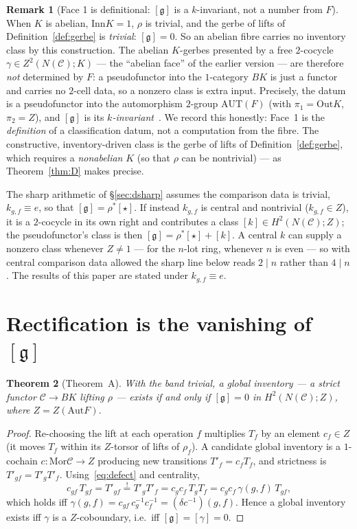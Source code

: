 \documentclass[11pt]{article}
\newtheorem{theorem}{Theorem}
\theoremstyle{definition}
\newtheorem{remark}[theorem]{Remark}
\newcommand{\C}{\mathcal{C}}
\newcommand{\Mor}{\mathrm{Mor}}
\newcommand{\Aut}{\mathrm{Aut}}
\newcommand{\Inn}{\mathrm{Inn}}
\newcommand{\Out}{\mathrm{Out}}
\newcommand{\Zc}{Z}
\newcommand{\gerbe}{\mathfrak{g}}
\begin{document}
\begin{remark}[{Face 1 is definitional: $[\gerbe]$ is a $k$-invariant, not a number from $F$}]%
\label{rem:kinvariant}
When $K$ is abelian, $\Inn K=1$, $\rho$ is trivial, and the gerbe of lifts of
Definition~\ref{def:gerbe} is \emph{trivial}: $[\gerbe]=0$. So an abelian fibre carries no
inventory class by this construction. The abelian $K$-gerbes presented by a free $2$-cocycle
$\gamma\in Z^2(N(\C);K)$ --- the ``abelian face'' of the earlier version --- are therefore
\emph{not} determined by $F$: a pseudofunctor into the $1$-category $BK$ is just a functor and
carries no $2$-cell data, so a nonzero class is extra input. Precisely, the datum is a
pseudofunctor into the automorphism $2$-group $\mathrm{AUT}(F)$ (with $\pi_1=\Out K$, $\pi_2=\Zc$),
and $[\gerbe]$ is its \emph{$k$-invariant}~\cite{bl,js}. We record this honestly: Face~1 is the
\emph{definition} of a classification datum, not a computation from the fibre. The constructive,
inventory-driven class is the gerbe of lifts of Definition~\ref{def:gerbe}, which requires a
\emph{nonabelian} $K$ (so that $\rho$ can be nontrivial) --- as Theorem~\ref{thm:D} makes precise.

The sharp arithmetic of \S\ref{sec:dsharp} assumes the comparison data is trivial,
$k_{g,f}\equiv e$, so that $[\gerbe]=\rho^*[\star]$. If instead $k_{g,f}$ is central and nontrivial
($k_{g,f}\in\Zc$), it is a $2$-cocycle in its own right and contributes a class
$[k]\in H^2(N(\C);\Zc)$; the pseudofunctor's class is then $[\gerbe]=\rho^*[\star]+[k]$. A central $k$
can supply a nonzero class whenever $\Zc\ne1$ --- for the $n$-lot ring, whenever $n$ is even --- so
with central comparison data allowed the sharp line below reads $2\mid n$ rather than $4\mid n$. The
results of this paper are stated under $k_{g,f}\equiv e$.
\end{remark}

\section{Rectification is the vanishing of $[\gerbe]$}\label{sec:A}

\begin{theorem}[Theorem~A]\label{thm:A}
With the band trivial, a global inventory --- a strict functor $\C\to BK$ lifting $\rho$ --- exists
if and only if $[\gerbe]=0$ in $H^2(N(\C);\Zc)$, where $\Zc=Z(\Aut F)$.
\end{theorem}

\begin{proof}
Re-choosing the lift at each operation $f$ multiplies $T_f$ by an element $c_f\in\Zc$ (it moves
$T_f$ within its $\Zc$-torsor of lifts of $\rho_f$). A candidate global inventory is a $1$-cochain
$c:\Mor\C\to\Zc$ producing new transitions $T'_f=c_f T_f$, and strictness is $T'_{gf}=T'_gT'_f$.
Using~\eqref{eq:defect} and centrality,
\[
c_{gf}\,T_{gf}=T'_{gf}\overset{!}{=}T'_gT'_f=c_gc_f\,T_gT_f=c_gc_f\,\gamma(g,f)\,T_{gf},
\]
which holds iff $\gamma(g,f)=c_{gf}\,c_g^{-1}c_f^{-1}=(\delta c^{-1})(g,f)$. Hence a global
inventory exists iff $\gamma$ is a $\Zc$-coboundary, i.e.\ iff $[\gerbe]=[\gamma]=0$.
\end{proof}
\end{document}
